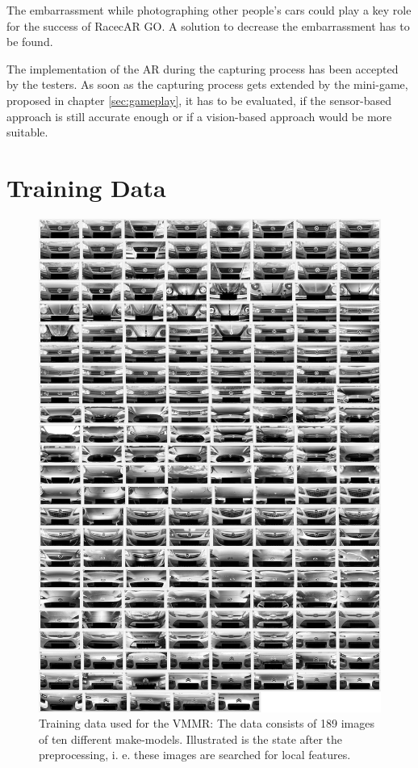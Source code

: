 The embarrassment while photographing other people's cars could play a key role for the success of RacecAR GO. A solution to decrease the embarrassment has to be found.
 
The implementation of the AR during the capturing process has been accepted by the testers. As soon as the capturing process gets extended by the mini-game, proposed in chapter \ref{sec:gameplay}, it has to be evaluated, if the sensor-based approach is still accurate enough or if a vision-based approach would be more suitable.


\cleardoublepage
    \appendix
\chapter{Training Data}
\begin{figure}[btph]
  \centering
        \includegraphics[width=.7\linewidth]{gfx/training_data}
        \caption{Training data used for the VMMR: The data consists of 189 images of ten different make-models. Illustrated is the state after the preprocessing, i. e. these images are searched for local features.}
        \label{fig:trainingData}
\end{figure}


